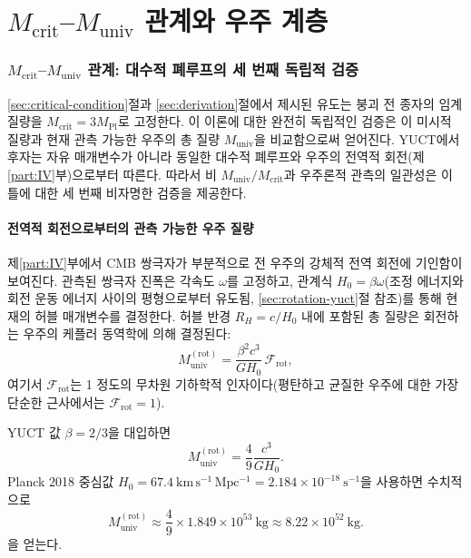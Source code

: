 \documentclass[11pt,a4paper]{article}
\begin{document}
	\part{\(M_{\mathrm{crit}}\)–\(M_{\mathrm{univ}}\) 관계와 우주 계층}
	\label{part:II}
	
	\section{\(M_{\mathrm{crit}}\)–\(M_{\mathrm{univ}}\) 관계: 대수적 폐루프의 세 번째 독립적 검증}
	\label{sec:third-test}
	
	\ref{sec:critical-condition}절과 \ref{sec:derivation}절에서 제시된 유도는 붕괴 전 종자의 임계 질량을 \(M_{\mathrm{crit}} = 3 M_{\mathrm{Pl}}\)로 고정한다. 이 이론에 대한 완전히 독립적인 검증은 이 미시적 질량과 현재 관측 가능한 우주의 총 질량 \(M_{\mathrm{univ}}\)을 비교함으로써 얻어진다. YUCT에서 후자는 자유 매개변수가 아니라 동일한 대수적 폐루프와 우주의 전역적 회전(제\ref{part:IV}부)으로부터 따른다. 따라서 비 \(M_{\mathrm{univ}} / M_{\mathrm{crit}}\)과 우주론적 관측의 일관성은 이 틀에 대한 세 번째 비자명한 검증을 제공한다.
	
	\subsection{전역적 회전으로부터의 관측 가능한 우주 질량}
	
	제\ref{part:IV}부에서 CMB 쌍극자가 부분적으로 전 우주의 강체적 전역 회전에 기인함이 보여진다. 관측된 쌍극자 진폭은 각속도 \(\omega\)를 고정하고, 관계식 \(H_0 = \beta \omega\)(조정 에너지와 회전 운동 에너지 사이의 평형으로부터 유도됨, \ref{sec:rotation-yuct}절 참조)를 통해 현재의 허블 매개변수를 결정한다. 허블 반경 \(R_H = c / H_0\) 내에 포함된 총 질량은 회전하는 우주의 케플러 동역학에 의해 결정된다:
	\begin{equation}
		M_{\mathrm{univ}}^{\mathrm{(rot)}} = \frac{\beta^2 c^3}{G H_0} \, \mathcal{F}_{\mathrm{rot}},
		\label{eq:muniv-rot}
	\end{equation}
	여기서 \(\mathcal{F}_{\mathrm{rot}}\)는 1 정도의 무차원 기하학적 인자이다(평탄하고 균질한 우주에 대한 가장 단순한 근사에서는 \(\mathcal{F}_{\mathrm{rot}} = 1\)).
	
	YUCT 값 \(\beta = 2/3\)을 대입하면
	\begin{equation}
		M_{\mathrm{univ}}^{\mathrm{(rot)}} = \frac{4}{9} \frac{c^3}{G H_0}.
		\label{eq:muniv-rot-beta}
	\end{equation}
	Planck 2018 중심값 \(H_0 = 67.4\ \mathrm{km\,s^{-1}\,Mpc^{-1}} = 2.184\times 10^{-18}\ \mathrm{s^{-1}}\)을 사용하면 수치적으로
	\[
	M_{\mathrm{univ}}^{\mathrm{(rot)}} \approx \frac{4}{9} \times 1.849\times 10^{53}\ \mathrm{kg} \approx 8.22\times 10^{52}\ \mathrm{kg}.
	\]
	을 얻는다.
	
\end{document}

